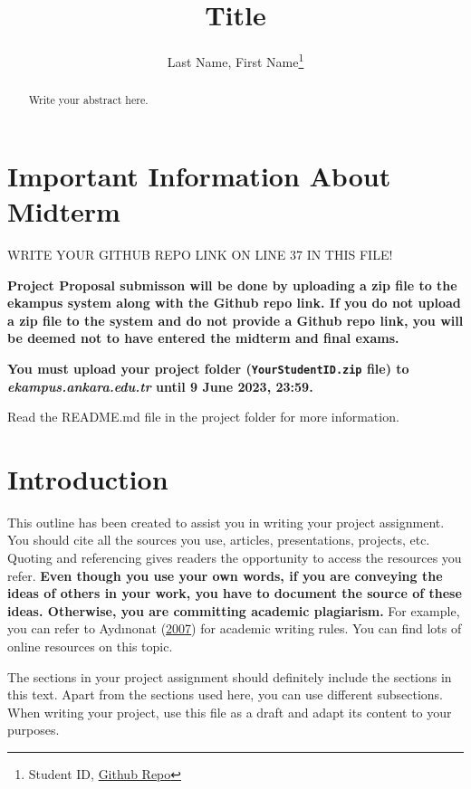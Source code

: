 \documentclass[
  12pt,
]{article}
\title{Title}
\author{Last Name, First Name\footnote{Student ID, \href{https://github.com/YOUR_USER_NAME_HERE/YOUR_REPO_NAME_HERE}{Github Repo}}}
\date{}
\begin{document}
\maketitle
\begin{abstract}
Write your abstract here.
\end{abstract}

\hypertarget{important-information-about-midterm}{%
\section{Important Information About Midterm}\label{important-information-about-midterm}}

\colorbox{BurntOrange}{WRITE YOUR GITHUB REPO LINK ON LINE 37 IN THIS FILE!}

\textbf{Project Proposal submisson will be done by uploading a zip file to the ekampus system along with the Github repo link. If you do not upload a zip file to the system and do not provide a Github repo link, you will be deemed not to have entered the midterm and final exams.}

\textbf{You must upload your project folder (\texttt{YourStudentID.zip} file) to \emph{ekampus.ankara.edu.tr} until 9 June 2023, 23:59.}

\colorbox{WildStrawberry}{Read the README.md file in the project folder for more information.}

\hypertarget{introduction}{%
\section{Introduction}\label{introduction}}

This outline has been created to assist you in writing your project assignment. You should cite all the sources you use, articles, presentations, projects, etc. Quoting and referencing gives readers the opportunity to access the resources you refer. \textbf{Even though you use your own words, if you are conveying the ideas of others in your work, you have to document the source of these ideas. Otherwise, you are committing academic plagiarism.} For example, you can refer to Aydınonat (\protect\hyperlink{ref-aydinonat:2007}{2007}) for academic writing rules. You can find lots of online resources on this topic.

The sections in your project assignment should definitely include the sections in this text. Apart from the sections used here, you can use different subsections. When writing your project, use this file as a draft and adapt its content to your purposes.
\end{document}
